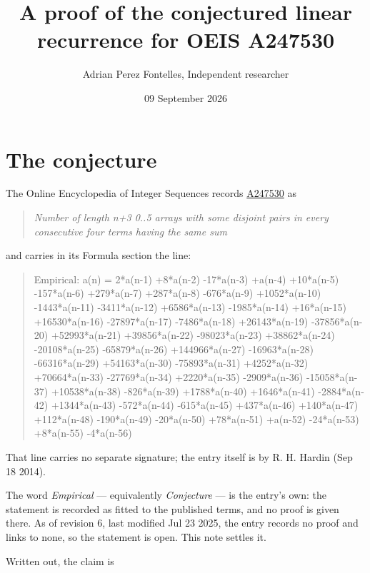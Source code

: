 \documentclass[11pt]{article}
\title{A proof of the conjectured linear recurrence for OEIS A247530}
\author{Adrian Perez Fontelles, Independent researcher}
\date{09 September 2026}
\theoremstyle{definition}
\begin{document}
\maketitle
\section{The conjecture}

The Online Encyclopedia of Integer Sequences records \href{https://oeis.org/A247530}{A247530} as

\begin{quote}\itshape Number of length n+3 0..5 arrays with some disjoint pairs in every consecutive four terms having the same sum\end{quote}

and carries in its Formula section the line:

\begin{quote}\ttfamily Empirical: a(n) = 2*a(n-1) +8*a(n-2) -17*a(n-3) +a(n-4) +10*a(n-5) -157*a(n-6) +279*a(n-7) +287*a(n-8) -676*a(n-9) +1052*a(n-10) -1443*a(n-11) -3411*a(n-12) +6586*a(n-13) -1985*a(n-14) +16*a(n-15) +16530*a(n-16) -27897*a(n-17) -7486*a(n-18) +26143*a(n-19) -37856*a(n-20) +52993*a(n-21) +39856*a(n-22) -98023*a(n-23) +38862*a(n-24) -20108*a(n-25) -65879*a(n-26) +144966*a(n-27) -16963*a(n-28) -66316*a(n-29) +54163*a(n-30) -75893*a(n-31) +4252*a(n-32) +70664*a(n-33) -27769*a(n-34) +2220*a(n-35) -2909*a(n-36) -15058*a(n-37) +10538*a(n-38) -826*a(n-39) +1788*a(n-40) +1646*a(n-41) -2884*a(n-42) +1344*a(n-43) -572*a(n-44) -615*a(n-45) +437*a(n-46) +140*a(n-47) +112*a(n-48) -190*a(n-49) -20*a(n-50) +78*a(n-51) +a(n-52) -24*a(n-53) +8*a(n-55) -4*a(n-56)\end{quote}

That line carries no separate signature; the entry itself is by R. H. Hardin (Sep 18 2014).

The word {\itshape Empirical} --- equivalently {\itshape Conjecture} --- is the entry's own: the statement is recorded as fitted to the published terms, and no proof is given there. As of revision 6, last modified Jul 23 2025, the entry records no proof and links to none, so the statement is open. This note settles it.

Written out, the claim is
\end{document}
